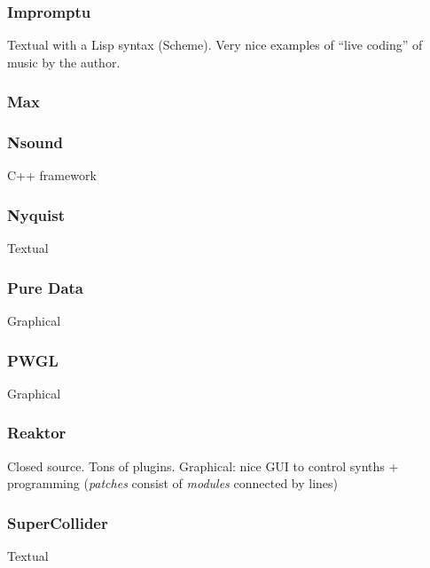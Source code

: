 \documentclass{article}
\begin{document}
\subsubsection{Impromptu}
\cite{impromptu} Textual with a Lisp syntax (Scheme). Very nice examples of ``live
coding'' of music by the author.

\subsubsection{Max}
\cite{max}

\subsubsection{Nsound}
\cite{nsound} C++ framework

\subsubsection{Nyquist}
\cite{nyquist}
Textual

\subsubsection{Pure Data}
\cite{puredata}
Graphical

\subsubsection{PWGL}
\cite{pwgl}
Graphical

\subsubsection{Reaktor}
\cite{reaktor} Closed source. Tons of plugins. Graphical: nice GUI to control
synths + programming (\emph{patches} consist of \emph{modules} connected by
lines)

\subsubsection{SuperCollider}
\cite{supercollider}
Textual




\end{document}
